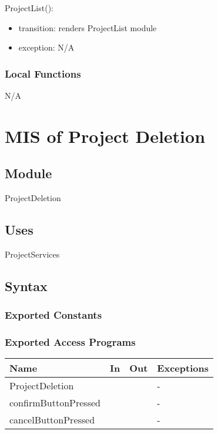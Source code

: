 \documentclass[12pt, titlepage]{article}
\begin{document}
	\noindent ProjectList():
	\begin{itemize}
		\item transition: renders ProjectList module
		\item exception: N/A
	\end{itemize}
	
	\subsubsection{Local Functions}
	
	N/A
	
	\newpage
	
	\section{MIS of Project Deletion} \label{Module} 
	
	\subsection{Module}
	
	ProjectDeletion
	
	\subsection{Uses}
	ProjectServices
	
	\subsection{Syntax}
	
	\subsubsection{Exported Constants}
	
	\subsubsection{Exported Access Programs}
	
	\begin{center}
		\begin{tabular}{p{2cm} p{4cm} p{4cm} p{2cm}}
			\hline
			\textbf{Name} & \textbf{In} & \textbf{Out} & \textbf{Exceptions} \\
			\hline
			ProjectDeletion & & & - \\
			\hline
			confirmButtonPressed & & & - \\
			\hline
			cancelButtonPressed & & & - \\
			\hline
		\end{tabular}
	\end{center}
	
\end{document}
